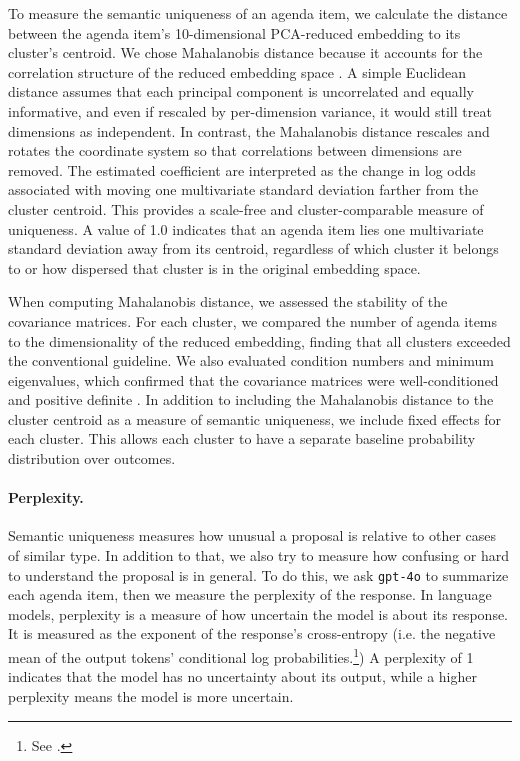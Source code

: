 To measure the semantic uniqueness of an agenda item, we calculate the distance between the agenda item's 10-dimensional PCA-reduced embedding to its cluster's centroid. We chose Mahalanobis distance because it accounts for the correlation structure of the reduced embedding space \citep[p. 93]{rencher2012}. A simple Euclidean distance assumes that each principal component is uncorrelated and equally informative, and even if rescaled by per-dimension variance, it would still treat dimensions as independent. In contrast, the Mahalanobis distance rescales and rotates the coordinate system so that correlations between dimensions are removed. The estimated coefficient are interpreted as the change in log odds associated with moving one multivariate standard deviation farther from the cluster centroid. This provides a scale-free and cluster-comparable measure of uniqueness. A value of 1.0 indicates that an agenda item lies one multivariate standard deviation away from its centroid, regardless of which cluster it belongs to or how dispersed that cluster is in the original embedding space. 

When computing Mahalanobis distance, we assessed the stability of the covariance matrices. For each cluster, we compared the number of agenda items to the dimensionality of the reduced embedding, finding that all clusters exceeded the conventional guideline. We also evaluated condition numbers and minimum eigenvalues, which confirmed that the covariance matrices were well-conditioned and positive definite \citep[p.~268]{aguinis2009}. In addition to including the Mahalanobis distance to the cluster centroid as a measure of semantic uniqueness, we include fixed effects for each cluster. This allows each cluster to have a separate baseline probability distribution over outcomes.

\paragraph{Perplexity.} Semantic uniqueness measures how unusual a proposal is relative to other cases of similar type. In addition to that, we also try to measure how confusing or hard to understand the proposal is in general. To do this, we ask \texttt{gpt-4o} to summarize each agenda item, then we measure the perplexity of the response. In language models, perplexity is a measure of how uncertain the model is about its response. It is measured as the exponent of the response's cross-entropy  (i.e. the negative mean of the output tokens' conditional log probabilities.\footnote{See \citet{jm2}.}) A perplexity of 1 indicates that the model has no uncertainty about its output, while a higher perplexity means the model is more uncertain. 

